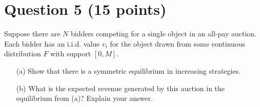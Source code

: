 \documentclass[10pt,a4paper]{article}
\begin{document}
\section*{Question 5 (15 points)}
Suppose there are $N$ bidders competing for a single object in an all-pay auction. Each bidder has an i.i.d. value $v_i$ for the object drawn from some continuous distribution $F$ with support $[0, M]$.
\begin{enumerate}
    \item[(a)] Show that there is a symmetric equilibrium in increasing strategies.
    \item[(b)] What is the expected revenue generated by this auction in the equilibrium from (a)? Explain your answer.
\end{enumerate}
\end{document}
